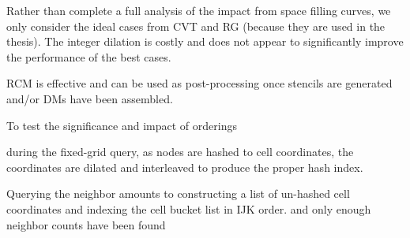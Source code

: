 \documentclass{report}
\begin{document}
Rather than complete a full analysis of the impact from space filling curves, we only consider the ideal cases from CVT and RG (because they are used in the thesis). The integer dilation is costly and does not appear to significantly improve the performance of the best cases.

RCM is effective and can be used as post-processing once stencils are generated and/or DMs have been assembled. 


%




To test the significance and impact of orderings

during the fixed-grid query, as nodes are hashed to cell coordinates, the coordinates are dilated and interleaved to produce the proper hash index. 

Querying the neighbor amounts to constructing a list of un-hashed cell coordinates and indexing the cell bucket list in IJK order.  and only enough neighbor counts have been found
\end{document}
